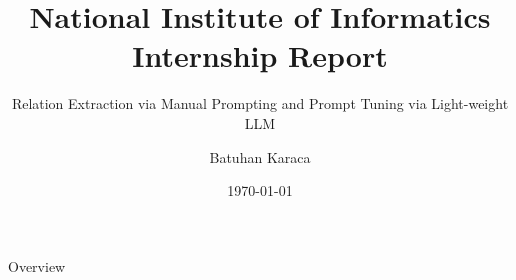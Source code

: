 \documentclass[aspectratio=169,xcolor=dvipsnames]{beamer}
\title{National Institute of Informatics Internship Report}
\subtitle{Relation Extraction via Manual Prompting and Prompt Tuning via Light-weight LLM}
\author{Batuhan Karaca}
\institute
{
    Department of Computer Science \\
    University of Freiburg %
}
\date{\today} %
\begin{document}
\begin{frame}
    \titlepage
\end{frame}

\begin{frame}{Overview}
    \tableofcontents
\end{frame}
\end{document}
